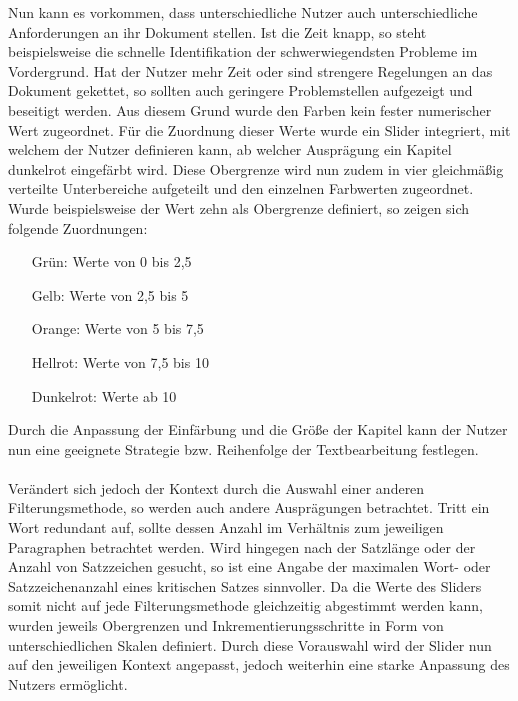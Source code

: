Nun kann es vorkommen, dass unterschiedliche Nutzer auch unterschiedliche Anforderungen an ihr Dokument stellen. Ist die Zeit knapp, so steht beispielsweise die schnelle Identifikation der schwerwiegendsten Probleme im Vordergrund. Hat der Nutzer mehr Zeit oder sind strengere Regelungen an das Dokument gekettet, so sollten auch geringere Problemstellen aufgezeigt und beseitigt werden. Aus diesem Grund wurde den Farben kein fester numerischer Wert zugeordnet. F\"ur die Zuordnung dieser Werte wurde ein Slider integriert, mit welchem der Nutzer definieren kann, ab welcher Auspr\"agung ein Kapitel dunkelrot eingef\"arbt wird. Diese Obergrenze wird nun zudem in vier gleichm\"a{\ss}ig verteilte Unterbereiche aufgeteilt und den einzelnen Farbwerten zugeordnet. Wurde beispielsweise der Wert zehn als Obergrenze definiert, so zeigen sich folgende Zuordnungen:\\
\begin{center} 
   \begin{varwidth}{2in} 
      \begin{itemize} 
         \item[Gr\"un:] Werte von 0 bis 2,5 
		 \item[Gelb:] Werte von 2,5 bis 5
		 \item[Orange:] Werte von 5 bis 7,5
		 \item[Hellrot:] Werte von 7,5 bis 10
		 \item[Dunkelrot:] Werte ab 10
      \end{itemize} 
   \end{varwidth} 
\end{center} 
Durch die Anpassung der Einf\"arbung und die Gr\"o{\ss}e der Kapitel kann der Nutzer nun eine geeignete Strategie bzw. Reihenfolge der Textbearbeitung festlegen.\\
\\
Ver\"andert sich jedoch der Kontext durch die Auswahl einer anderen Filterungsmethode, so werden auch andere Auspr\"agungen betrachtet. Tritt ein Wort redundant auf, sollte dessen Anzahl im Verh\"altnis zum jeweiligen Paragraphen betrachtet werden. Wird hingegen nach der Satzl\"ange oder der Anzahl von Satzzeichen gesucht, so ist eine Angabe der maximalen Wort- oder Satzzeichenanzahl eines kritischen Satzes sinnvoller. Da die Werte des Sliders somit nicht auf jede Filterungsmethode gleichzeitig abgestimmt werden kann, wurden jeweils Obergrenzen und Inkrementierungsschritte in Form von unterschiedlichen Skalen definiert. Durch diese Vorauswahl wird der Slider nun auf den jeweiligen Kontext angepasst, jedoch weiterhin eine starke Anpassung des Nutzers erm\"oglicht.\\
